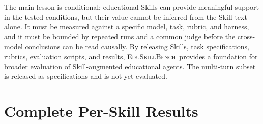 \documentclass[10pt]{article}
\newcommand{\bench}{\textsc{EduSkillBench}\xspace}
\begin{document}
The main lesson is conditional: educational Skills can provide meaningful support in the tested conditions, but their value cannot be inferred from the Skill text alone. It must be measured against a specific model, task, rubric, and harness, and it must be bounded by repeated runs and a common judge before the cross-model conclusions can be read causally. By releasing Skills, task specifications, rubrics, evaluation scripts, and results, \bench~provides a foundation for broader evaluation of Skill-augmented educational agents. The multi-turn subset is released as specifications and is not yet evaluated.

\appendix

\section{Complete Per-Skill Results}
\end{document}

